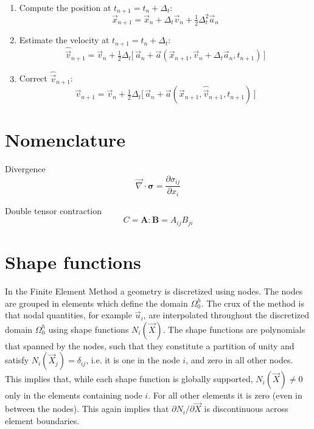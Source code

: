 \documentclass[times,namecite]{goose-article}
\begin{document}
\begin{enumerate}
  \item Compute the position at $t_{n+1} = t_{n} + \Delta_t$:
  \begin{equation}
    \vec{x}_{n+1}
    =
    \vec{x}_{n} + \Delta_t \vec{v}_{n} + \tfrac{1}{2} \Delta_t^2 \vec{a}_{n}
  \end{equation}
  \item Estimate the velocity at $t_{n+1} = t_{n} + \Delta_t$:
  \begin{equation}
    \hat{\vec{v}}_{n+1}
    =
    \vec{v}_{n}
    +
    \tfrac{1}{2} \Delta_t \Big[\,
      \vec{a}_{n} + \vec{a} ( \vec{x}_{n+1} , \vec{v}_{n} + \Delta_t \vec{a}_{n} , t_{n+1} ) \,
    \Big]
  \end{equation}
  \item Correct $\hat{\vec{v}}_{n+1}$:
  \begin{equation}
    \vec{v}_{n+1}
    =
    \vec{v}_{n}
    +
    \tfrac{1}{2} \Delta_t \Big[\,
      \vec{a}_{n} + \vec{a} ( \vec{x}_{n+1} , \hat{\vec{v}}_{n+1} , t_{n+1} ) \,
    \Big]
  \end{equation}
\end{enumerate}



\appendix

\section{Nomenclature}

Divergence
\begin{equation}
  \vec{\nabla} \cdot \bm{\sigma} = \frac{ \partial \sigma_{ij} }{ \partial x_i }
\end{equation}

Double tensor contraction
\begin{equation}
  C = \bm{A} : \bm{B} = A_{ij} B_{ji}
\end{equation}

\section{Shape functions}

In the Finite Element Method a geometry is discretized using nodes. The nodes are grouped in elements which define the domain $\Omega^h_0$. The crux of the method is that nodal quantities, for example $\vec{u}_i$, are interpolated throughout the discretized domain $\Omega^h_0$ using shape functions $N_i (\vec{X})$. The shape functions are polynomials that spanned by the nodes, such that they constitute a partition of unity and satisfy $N_i (\vec{X}_j) = \delta_{ij}$, i.e. it is one in the node $i$, and zero in all other nodes. This implies that, while each shape function is globally supported, $N_i (\vec{X}) \neq 0$ only in the elements containing node $i$. For all other elements it is zero (even in between the nodes). This again implies that $\partial N_i / \partial \vec{X}$ is discontinuous across element boundaries.
\end{document}
